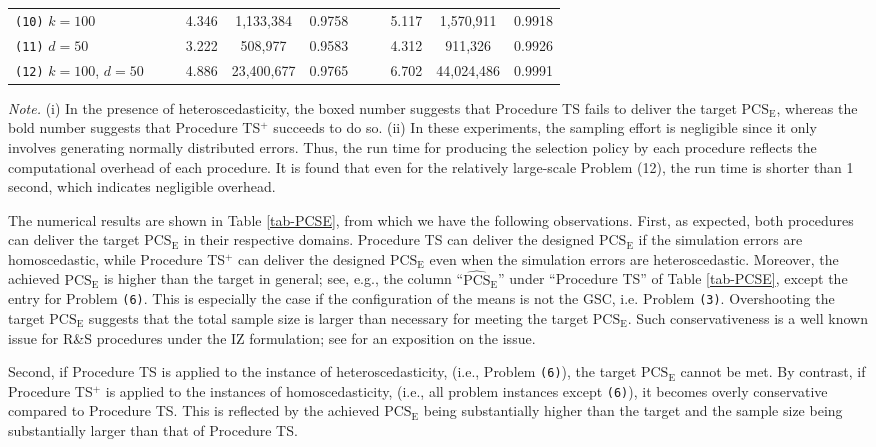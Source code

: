 \documentclass[ijoc,nonblindrev]{informs3}
\def\PCSE{\mathrm{PCS}_{\mathrm{E}}}
\def\APCSE{\widehat{\mathrm{PCS}}_{\mathrm{E}}}
\begin{document}
\begin{table}[!b]
\begin{tabular}{lcccccccccc}
    \texttt{(10)} $k=100$ & &             & 4.346 & \phantom{0}1,133,384 & 0.9758 & &            & 5.117 & \phantom{0}1,570,911           & 0.9918 \\
    \texttt{(11)} $d=50$ & &              & 3.222 & \phantom{00,}508,977 & 0.9583 & &            & 4.312 & \phantom{00,}911,326           & 0.9926 \\
    \texttt{(12)} $k=100$, $d=50$ & &     & 4.886 & 23,400,677 & 0.9765 & &            & 6.702 & 44,024,486           & 0.9991 \\
    \bottomrule
    \end{tabular}
\begin{minipage}[t]{1\linewidth}
\SingleSpacedXI
\vspace{0.6em}
\footnotesize{
\emph{Note.} \textsf{(i) In the presence of heteroscedasticity, the boxed number suggests that Procedure TS fails to deliver the target $\PCSE$, whereas the bold number suggests that Procedure TS$^+$ succeeds to do so.
{\selectfont
(ii) In these experiments, the sampling effort is negligible since it only involves generating normally distributed errors.
Thus, the run time for producing the selection policy by each procedure reflects the computational overhead of each procedure.
It is found that even for the relatively large-scale Problem (12), the run time is shorter than 1 second, which indicates negligible overhead.}}
}
\end{minipage}
\end{table}%


The numerical results are shown in Table \ref{tab-PCSE}, from which we have the following observations.
First, as expected, both procedures can deliver the target $\PCSE$ in their respective domains.
Procedure TS can deliver the designed $\PCSE$ if the simulation errors are homoscedastic,
while Procedure TS$^+$ can deliver the designed $\PCSE$ even when the simulation errors are heteroscedastic.
Moreover, the achieved $\PCSE$ is higher than the target in general; see, e.g., the column ``$\APCSE$'' under ``Procedure TS'' of Table \ref{tab-PCSE}, except the entry for Problem \texttt{(6)}.
This is especially the case if the configuration of the means is not the GSC, i.e. Problem \texttt{(3)}.
Overshooting the target $\PCSE$ suggests that the total sample size is larger than necessary for meeting the target $\PCSE$.
Such conservativeness is a well known issue for R\&S procedures under the IZ formulation; see \cite{fan2016} for an exposition on the issue.


Second,  if Procedure TS is applied to the instance of heteroscedasticity, (i.e., Problem \texttt{(6)}), the target $\PCSE$ cannot be met.
By contrast, if Procedure TS$^+$ is applied to the instances of homoscedasticity, (i.e., all problem instances except \texttt{(6)}), it becomes overly conservative compared to Procedure TS.
This is reflected by the achieved $\PCSE$ being substantially higher than the target and the sample size being substantially larger than that of Procedure TS.
\end{document}
